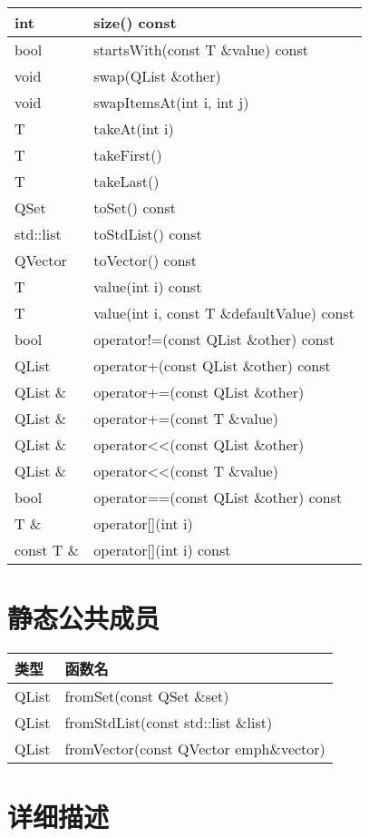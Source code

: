 \begin{longtable}[l]{|l|m{25em}|}
\hline
int& 	size() const\\
\hline
bool& 	startsWith(const T \&value) const\\
\hline
void& 	swap(QList \&other)\\
\hline
void& 	swapItemsAt(int i, int j)\\
\hline
T& 	takeAt(int i)\\
\hline
T& 	takeFirst()\\
\hline
T& 	takeLast()\\
\hline
QSet 	&toSet() const\\
\hline
std::list& 	toStdList() const\\
\hline
QVector &	toVector() const\\
\hline
T 	&value(int i) const\\
\hline
T 	&value(int i, const T \&defaultValue) const\\
\hline
bool &	operator!=(const QList \&other) const\\
\hline
QList& 	operator+(const QList \&other) const\\
\hline
QList \& &	operator+=(const QList \&other)\\
\hline
QList \& &	operator+=(const T \&value)\\
\hline
QList \& &	operator<<(const QList \&other)\\
\hline
QList \& &	operator<<(const T \&value)\\
\hline
bool 	&operator==(const QList \&other) const\\
\hline
T \& 	& operator[](int i)\\
\hline
const T \& & 	operator[](int i) const\\
\hline
\end{longtable}


\section{静态公共成员}

\begin{tabular}{|l|l|}
\hline
 类型& 	函数名\\
\hline
QList& 	fromSet(const QSet \&set)\\
\hline
QList& 	fromStdList(const std::list \&list)\\
\hline
QList& 	fromVector(const QVector emph{\&vector})\\
\hline
\end{tabular}

\section{详细描述}

